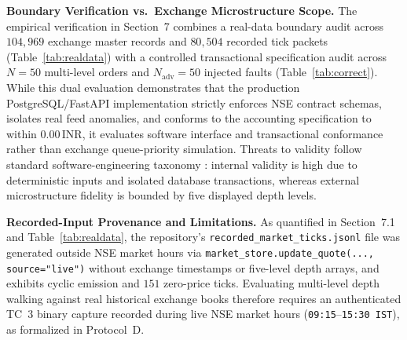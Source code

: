 \documentclass[journal,onecolumn,10pt]{IEEEtran}
\newcommand{\thinunit}[2]{#1\,\text{#2}}
\begin{document}
\textbf{Boundary Verification vs.\ Exchange Microstructure Scope.} The empirical verification in Section~7 combines a real-data boundary audit across $104{,}969$ exchange master records and $80{,}504$ recorded tick packets (Table~\ref{tab:realdata}) with a controlled transactional specification audit across $N=50$ multi-level orders and $N_{\mathrm{adv}}=50$ injected faults (Table~\ref{tab:correct}). While this dual evaluation demonstrates that the production PostgreSQL/FastAPI implementation strictly enforces NSE contract schemas, isolates real feed anomalies, and conforms to the accounting specification to within $\thinunit{0.00}{INR}$, it evaluates software interface and transactional conformance rather than exchange queue-priority simulation. Threats to validity follow standard software-engineering taxonomy \cite{wohlin2012}: internal validity is high due to deterministic inputs and isolated database transactions, whereas external microstructure fidelity is bounded by five displayed depth levels.

\textbf{Recorded-Input Provenance and Limitations.} As quantified in Section~7.1 and Table~\ref{tab:realdata}, the repository's \texttt{recorded\_market\_ticks.jsonl} file was generated outside NSE market hours via \texttt{market\_store.update\_quote(..., source="live")} without exchange timestamps or five-level depth arrays, and exhibits cyclic emission and $151$ zero-price ticks. Evaluating multi-level depth walking against real historical exchange books therefore requires an authenticated TC~3 binary capture recorded during live NSE market hours (\texttt{09:15}--\texttt{15:30~IST}), as formalized in Protocol~D.
\end{document}
